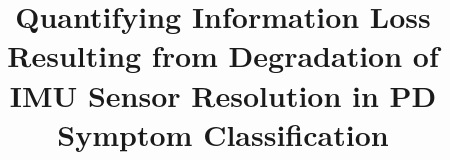 \documentclass[ITR,BA,english,intermediate, tutorial]{LSR_thesis}
\begin{document}
\title{Quantifying Information Loss Resulting from Degradation of IMU Sensor Resolution in PD Symptom Classification}
\titletranslation{
}


\maketitle



\newpage
\end{document}
